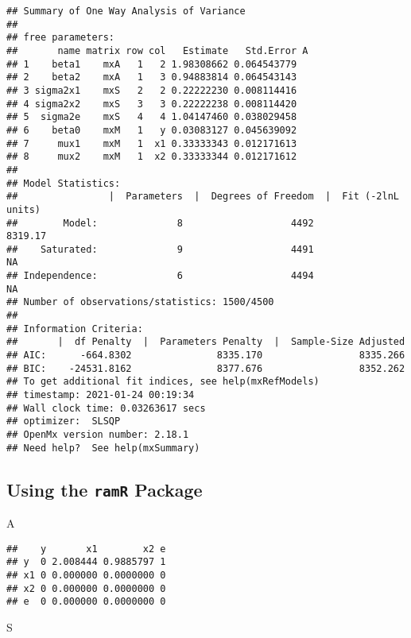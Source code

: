 \documentclass[
]{book}
\newenvironment{Shaded}{\begin{snugshade}}{\end{snugshade}}
\newcommand{\NormalTok}[1]{#1}
\theoremstyle{definition}
\theoremstyle{definition}
\theoremstyle{definition}
\theoremstyle{remark}
\begin{document}
\begin{verbatim}
## Summary of One Way Analysis of Variance 
##  
## free parameters:
##       name matrix row col   Estimate   Std.Error A
## 1    beta1    mxA   1   2 1.98308662 0.064543779  
## 2    beta2    mxA   1   3 0.94883814 0.064543143  
## 3 sigma2x1    mxS   2   2 0.22222230 0.008114416  
## 4 sigma2x2    mxS   3   3 0.22222238 0.008114420  
## 5  sigma2e    mxS   4   4 1.04147460 0.038029458  
## 6    beta0    mxM   1   y 0.03083127 0.045639092  
## 7     mux1    mxM   1  x1 0.33333343 0.012171613  
## 8     mux2    mxM   1  x2 0.33333344 0.012171612  
## 
## Model Statistics: 
##                |  Parameters  |  Degrees of Freedom  |  Fit (-2lnL units)
##        Model:              8                   4492               8319.17
##    Saturated:              9                   4491                    NA
## Independence:              6                   4494                    NA
## Number of observations/statistics: 1500/4500
## 
## Information Criteria: 
##       |  df Penalty  |  Parameters Penalty  |  Sample-Size Adjusted
## AIC:      -664.8302               8335.170                 8335.266
## BIC:    -24531.8162               8377.676                 8352.262
## To get additional fit indices, see help(mxRefModels)
## timestamp: 2021-01-24 00:19:34 
## Wall clock time: 0.03263617 secs 
## optimizer:  SLSQP 
## OpenMx version number: 2.18.1 
## Need help?  See help(mxSummary)
\end{verbatim}

\hypertarget{using-the-ramr-package-3}{%
\subsection{\texorpdfstring{Using the \texttt{ramR} Package}{Using the ramR Package}}\label{using-the-ramr-package-3}}

\begin{Shaded}
\begin{Highlighting}[]
\NormalTok{A}
\end{Highlighting}
\end{Shaded}

\begin{verbatim}
##    y       x1        x2 e
## y  0 2.008444 0.9885797 1
## x1 0 0.000000 0.0000000 0
## x2 0 0.000000 0.0000000 0
## e  0 0.000000 0.0000000 0
\end{verbatim}

\begin{Shaded}
\begin{Highlighting}[]
\NormalTok{S}
\end{Highlighting}
\end{Shaded}
\end{document}
